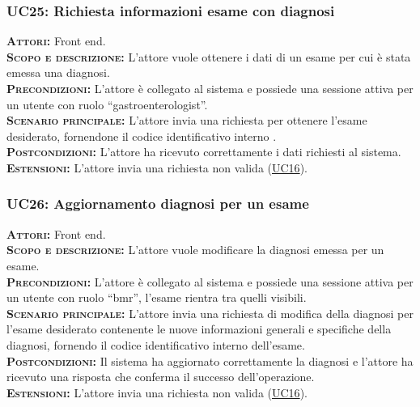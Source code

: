 \subsubsection{UC25: Richiesta informazioni esame con diagnosi}
\label{sec:UC25}
\textsc{\textbf{Attori:}} Front end.\\
\textsc{\textbf{Scopo e descrizione:}} L'attore vuole ottenere i dati di un esame per cui è stata emessa una diagnosi.\\
\textsc{\textsc{\textbf{Precondizioni:}}} L'attore è collegato al sistema e possiede una sessione attiva per un utente con ruolo ``gastroenterologist''.\\
\textsc{\textbf{Scenario principale:}}  L'attore invia una richiesta per ottenere l'esame desiderato, fornendone il codice identificativo interno .\\
\textsc{\textbf{Postcondizioni:}} L'attore ha ricevuto correttamente i dati richiesti al sistema.\\
\textsc{\textbf{Estensioni:}} L'attore invia una richiesta non valida (\hyperref[sec:UC16]{UC16}).

\subsubsection{UC26: Aggiornamento diagnosi per un esame}
\label{sec:UC26}
\textsc{\textbf{Attori:}} Front end.\\
\textsc{\textbf{Scopo e descrizione:}} L'attore vuole modificare la diagnosi emessa per un esame.\\
\textsc{\textsc{\textbf{Precondizioni:}}} L'attore è collegato al sistema e possiede una sessione attiva per un utente con ruolo ``bmr'', l'esame rientra tra quelli visibili.\\
\textsc{\textbf{Scenario principale:}}  L'attore invia una richiesta di modifica della diagnosi per l'esame desiderato contenente le nuove informazioni generali e specifiche della diagnosi, fornendo il codice identificativo interno dell'esame.\\
\textsc{\textbf{Postcondizioni:}} Il sistema ha aggiornato correttamente la diagnosi e l'attore ha ricevuto una risposta che conferma il successo dell'operazione.\\
\textsc{\textbf{Estensioni:}} L'attore invia una richiesta non valida (\hyperref[sec:UC16]{UC16}).

